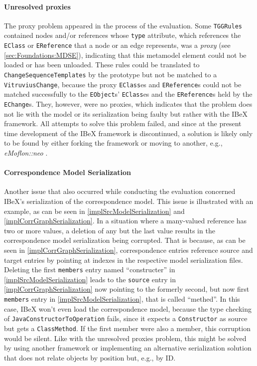 \paragraph{Unresolved proxies} The proxy problem appeared in the process of the evaluation.
Some \texttt{TGGRules} contained nodes and/or references whose \texttt{type} attribute, which references the \texttt{EClass} or \texttt{EReference} that a node or an edge represents, was a \emph{proxy} (see \autoref{sec:Foundations:MDSE}), indicating that this metamodel element could not be loaded or has been unloaded.
These rules could be translated to \texttt{ChangeSequenceTemplates} by the prototype but not be matched to a \texttt{VitruviusChange}, because the proxy \texttt{EClass}es and \texttt{EReference}s could not be matched successfully to the \texttt{EObject}s' \texttt{EClass}es and the \texttt{EReference}s held by the \texttt{EChange}s.
They, however, were no proxies, which indicates that the problem does not lie with the model or its serialization being faulty but rather with the IBeX framework. 
All attempts to solve this problem failed, and since at the present time development of the IBeX framework is discontinued, a solution is likely only to be found by either forking the framework or moving to another, e.g., \emph{eMoflon::neo} \cite{weidmann_emoflonneo_nodate}.

\paragraph{Correspondence Model Serialization} Another issue that also occurred while conducting the evaluation concerned IBeX's serialization of the correspondence model.
This issue is illustrated with an example, as can be seen in \autoref{implSrcModelSerialization} and \autoref{implCorrGraphSerialization}.
In a situation where a many-valued reference has two or more values, a deletion of any but the last value results in the correspondence model serialization being corrupted. That is because, as can be seen in \autoref{implCorrGraphSerialization}, correspondence entries reference source and target entries by pointing at indexes in the respective model serialization files.
Deleting the first \texttt{members} entry named \enquote{constructer} in \autoref{implSrcModelSerialization} leads to the \texttt{source} entry in \autoref{implCorrGraphSerialization} now pointing to the formerly second, but now first \texttt{members} entry in \autoref{implSrcModelSerialization}, that is called \enquote{methed}.
In this case, IBeX won't even load the correspondence model, because the type checking of \texttt{JavaConstructorToOperation} fails, since it expects a \texttt{Constructor} as source but gets a \texttt{ClassMethod}.
If the first member were also a member, this corruption would be silent.
Like with the unresolved proxies problem, this might be solved by using another framework or implementing an alternative serialization solution that does not relate objects by position but, e.g., by ID.

